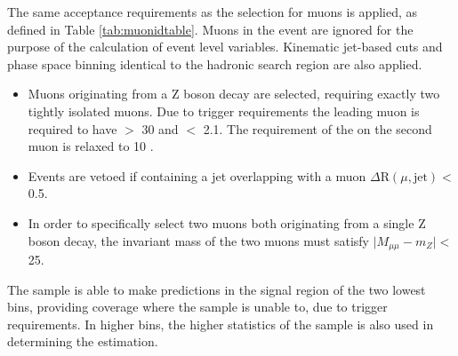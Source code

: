 \begin{itemize}
The same acceptance requirements as the \mupjets selection for muons is applied, as defined in Table  \ref{tab:muonidtable}. Muons  in the event are ignored for the purpose of the calculation of event level variables. Kinematic jet-based cuts and phase space binning identical to the hadronic search region are also applied.

\begin{itemize}
\item Muons originating from a Z boson decay are selected, requiring exactly two tightly isolated muons. Due to trigger requirements the leading muon is required to have  \pt $>$ 30 \GeV and \abeta $<$ 2.1. The requirement of the \pt on the second muon is relaxed to 10 \GeV.
\item Events are vetoed if containing a jet overlapping with a muon $\Delta \text{R}(\mu,\text{jet}) <$ 0.5. 
\item In order to specifically select two muons both originating from a single Z boson decay, the invariant mass of the two muons must satisfy $ \lvert M_{\mu\mu} - m_{Z}\rvert <$ 25. 
\end{itemize}

The \dimupjets sample is able to make predictions in the signal region of the two lowest \theht bins, providing coverage where the \gpjets sample is unable to, due to trigger requirements. In higher \theht bins, the higher statistics of the \gpjets sample is also used in determining the \zinv estimation.


\end{itemize}
